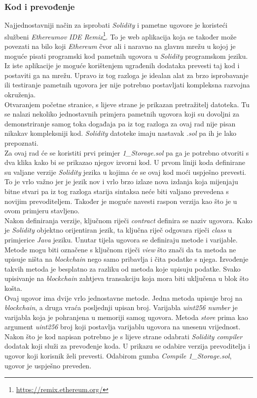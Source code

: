 \documentclass[times, utf8, zavrsni, numeric]{fer}
\begin{document}
\subsubsection{Kod i prevođenje}
Najjednostavniji način za isprobati \emph{Solidity} i pametne ugovore je koristeći službeni \emph{Ethereumov IDE Remix}\footnote{\url{https://remix.ethereum.org/}}. 
To je web aplikacija koja se također može povezati na bilo koji \emph{Ethereum} čvor ali i naravno na glavnu mrežu u kojoj je moguće pisati programski kod
pametnih ugovora u \emph{Solidity} programskom jeziku. Iz iste aplikacije je moguće korištenjem ugrađenih dodataka prevesti taj kod i postaviti ga na mrežu.
Upravo iz tog razloga je idealan alat za brzo isprobavanje ili testiranje pametnih ugovora jer nije potrebno postavljati kompleksna razvojna okruženja. \\
Otvaranjem početne stranice, s lijeve strane je prikazan pretražitelj datoteka. Tu se nalazi nekoliko jednostavnih primjera pametnih ugovora koji su dovoljni
za demonstriranje samog toka događaja pa iz tog razloga za ovaj rad nije pisan nikakav kompleksniji kod. \emph{Solidity} datoteke imaju nastavak \emph{.sol}
pa ih je lako prepoznati. \\
Za ovaj rad će se koristiti prvi primjer \emph{1\_Storage.sol} pa ga je potrebno otvoriti s dva klika kako bi se prikazao njegov izvorni kod.
U prvom liniji koda definirane su valjane verzije \emph{Solidity} jezika u kojima će se ovaj kod moći uspješno prevesti. To je vrlo važno jer je jezik
nov i vrlo brzo izlaze nova izdanja koja mijenjaju bitne stvari pa iz tog razloga starija sintaksa neće biti valjano prevedena s novijim prevoditeljem. Također je moguće
navesti raspon verzija kao što je u ovom primjeru stavljeno. \\
Nakon definiranja verzije, ključnom riječi \emph{contract} definira se naziv ugovora. Kako je \emph{Solidity} objektno orijentiran jezik, ta ključna riječ odgovara 
riječi \emph{class} u primjerice \emph{Java} jeziku. Unutar tijela ugovora se definiraju metode i varijable. Metode mogu biti označene s ključnom riječi \emph{view} što
znači da ta metoda ne upisuje ništa na \emph{blockchain} nego samo pribavlja i čita podatke s njega. Izvođenje takvih metoda je besplatno za razliku od metoda koje
upisuju podatke. Svako upisivanje na \emph{blockchain} zahtjeva transakciju koja mora biti uključena u blok što košta. \\
Ovaj ugovor ima dvije vrlo jednostavne metode. Jedna metoda upisuje broj na \emph{blockchain}, a druga vraća posljednji upisan broj. 
Varijabla \emph{uint256 number} je varijabla koja je pohranjena u memoriji samog ugovora. Metoda \emph{store} prima kao argument \emph{uint256} broj koji postavlja 
varijablu ugovora na unesenu vrijednost. \\
Nakon što je kod napisan potrebno je s lijeve strane odabrati \emph{Solidity compiler} dodatak koji služi za prevođenje koda. U prikazu se odabire verzija prevoditelja
i ugovor koji korisnik želi prevesti. Odabirom gumba \emph{Compile 1\_Storage.sol}, ugovor je uspješno preveden.
\end{document}
